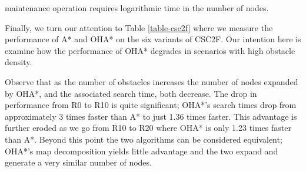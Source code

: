 maintenance operation requires logarithmic time in the number of nodes.
\par
Finally, we turn our attention to Table \ref{table-csc2f} where we measure the 
performance of A* and OHA* on the six variants of CSC2F.
Our intention here is examine how the performance of OHA* degrades in scenarios with
high obstacle density.

Observe that as the number of obstacles increases the number of nodes expanded by OHA*, and the
associated search time, both decrease. 
The drop in performance from R0 to R10 is quite significant; OHA*'s search times drop
from approximately 3 times faster than A* to just 1.36 times faster.
This advantage is further eroded as we go from R10 to R20 where OHA* is only 
1.23 times faster than A*.
Beyond this point the two algorithms can be considered equivalent;
OHA*'s map decomposition yields little advantage and the two expand and generate 
a very similar number of nodes.
